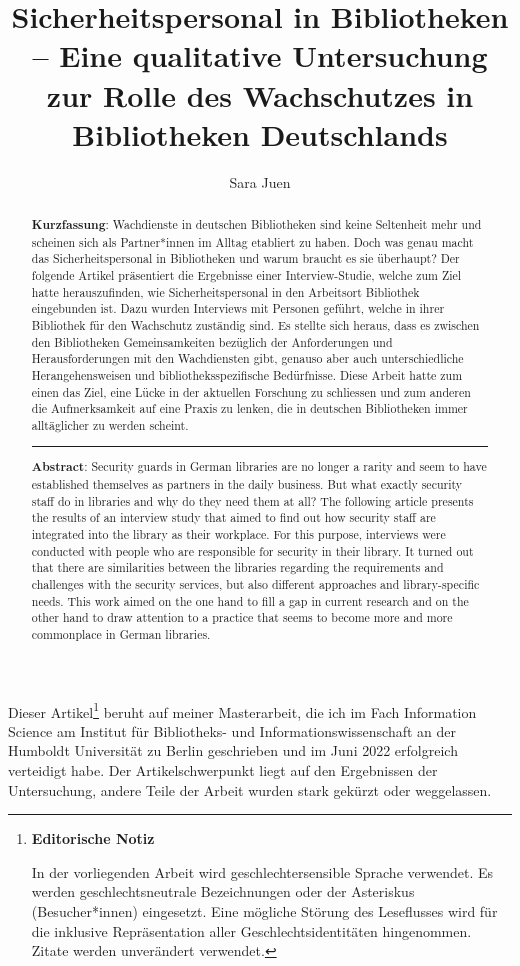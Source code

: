 \documentclass[a4paper,
fontsize=11pt,
oneside,
numbers=noperiodatend,
parskip=half-,
bibliography=totoc,
final
]{scrartcl}
\title{\LARGE{Sicherheitspersonal in Bibliotheken – Eine qualitative Untersuchung zur Rolle des Wachschutzes in Bibliotheken Deutschlands}}%
\author{Sara Juen} %
\date{}
\begin{document}
\maketitle
\thispagestyle{fancyplain} 

\begin{abstract}
\noindent
\textbf{Kurzfassung}: Wachdienste in deutschen Bibliotheken sind keine
Seltenheit mehr und scheinen sich als Partner*innen im Alltag etabliert
zu haben. Doch was genau macht das Sicherheitspersonal in Bibliotheken
und warum braucht es sie überhaupt? Der folgende Artikel präsentiert die
Ergebnisse einer Interview-Studie, welche zum Ziel hatte herauszufinden,
wie Sicherheitspersonal in den Arbeitsort Bibliothek eingebunden ist.
Dazu wurden Interviews mit Personen geführt, welche in ihrer Bibliothek
für den Wachschutz zuständig sind. Es stellte sich heraus, dass es
zwischen den Bibliotheken Gemeinsamkeiten bezüglich der Anforderungen
und Herausforderungen mit den Wachdiensten gibt, genauso aber auch
unterschiedliche Herangehensweisen und bibliotheksspezifische
Bedürfnisse. Diese Arbeit hatte zum einen das Ziel, eine Lücke in der
aktuellen Forschung zu schliessen und zum anderen die Aufmerksamkeit auf
eine Praxis zu lenken, die in deutschen Bibliotheken immer alltäglicher
zu werden scheint.

\begin{center}\rule{0.5\linewidth}{0.5pt}\end{center}

\noindent\textbf{Abstract}: Security guards in German libraries are no longer a
rarity and seem to have established themselves as partners in the daily
business. But what exactly security staff do in libraries and why do
they need them at all? The following article presents the results of an
interview study that aimed to find out how security staff are integrated
into the library as their workplace. For this purpose, interviews were
conducted with people who are responsible for security in their library.
It turned out that there are similarities between the libraries
regarding the requirements and challenges with the security services,
but also different approaches and library-specific needs. This work
aimed on the one hand to fill a gap in current research and on the other
hand to draw attention to a practice that seems to become more and more
commonplace in German libraries.
\end{abstract}

Dieser Artikel\footnote{\textbf{Editorische Notiz}

  In der vorliegenden Arbeit wird geschlechtersensible Sprache
  verwendet. Es werden geschlechtsneutrale Bezeichnungen oder der
  Asteriskus (Besucher*innen) eingesetzt. Eine mögliche Störung des
  Leseflusses wird für die inklusive Repräsentation aller
  Geschlechtsidentitäten hingenommen. Zitate werden unverändert
  verwendet.} beruht auf meiner Masterarbeit, die ich im Fach
Information Science am Institut für Bibliotheks- und
Informationswissenschaft an der Humboldt Universität zu Berlin
geschrieben und im Juni 2022 erfolgreich verteidigt habe. Der
Artikelschwerpunkt liegt auf den Ergebnissen der Untersuchung, andere
Teile der Arbeit wurden stark gekürzt oder weggelassen.
\end{document}
